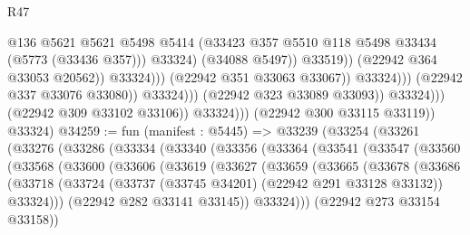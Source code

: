 \begin{lexlean}{R47}
\begin{coremodule}
                                                        @136
                                                        @5621
                                                        @5621
                                                        @5498
                                                        @5414
                                                        (@33423
                                                          @357
                                                          @5510
                                                          @118
                                                          @5498
                                                          @33434
                                                          (@5773 (@33436 @357)))
                                                        @33324)
                                                      (@34088 @5497))
                                                    @33519))
                                                (@22942 @364 @33053 @20562))
                                              @33324)))
                                        (@22942 @351 @33063 @33067))
                                      @33324)))
                                (@22942 @337 @33076 @33080))
                              @33324)))
                        (@22942 @323 @33089 @33093))
                      @33324)))
                (@22942 @309 @33102 @33106))
              @33324)))
        (@22942 @300 @33115 @33119))
      @33324)
@34259 := fun (manifest : @5445) =>
  @33239
    (@33254
      (@33261
        (@33276
          (@33286
            (@33334
              (@33340
                (@33356
                  (@33364
                    (@33541
                      (@33547
                        (@33560
                          (@33568
                            (@33600
                              (@33606
                                (@33619
                                  (@33627
                                    (@33659
                                      (@33665
                                        (@33678
                                          (@33686
                                            (@33718
                                              (@33724
                                                (@33737 (@33745 @34201) (@22942 @291 @33128 @33132))
                                                @33324)))
                                          (@22942 @282 @33141 @33145))
                                        @33324)))
                                  (@22942 @273 @33154 @33158))

\end{coremodule}
\end{lexlean}

